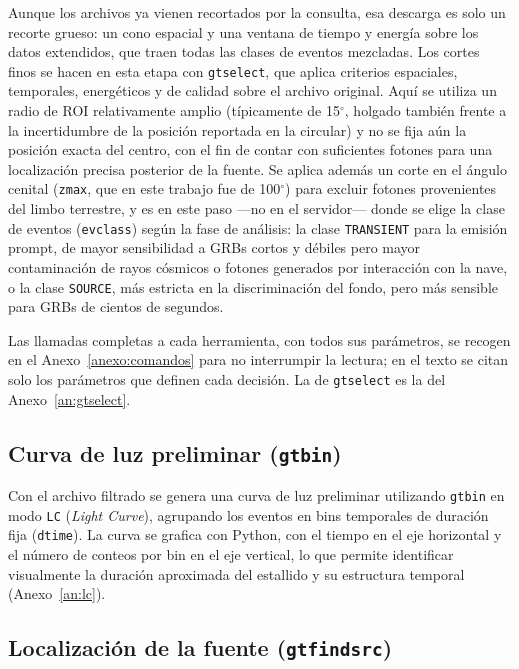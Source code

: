 Aunque los archivos ya vienen recortados por la consulta, esa descarga es solo un recorte grueso: un cono espacial y una ventana de tiempo y energía sobre los datos extendidos, que traen todas las clases de eventos mezcladas. Los cortes finos se hacen en esta etapa con \texttt{gtselect}, que aplica criterios espaciales, temporales, energéticos y de calidad sobre el archivo original. Aquí se utiliza un radio de ROI relativamente amplio (típicamente de 15$^{\circ}$, holgado también frente a la incertidumbre de la posición reportada en la circular) y no se fija aún la posición exacta del centro, con el fin de contar con suficientes fotones para una localización precisa posterior de la fuente. Se aplica además un corte en el ángulo cenital (\texttt{zmax}, que en este trabajo fue de 100$^{\circ}$) para excluir fotones provenientes del limbo terrestre, y es en este paso —no en el servidor— donde se elige la clase de eventos (\texttt{evclass}) según la fase de análisis: la clase \texttt{TRANSIENT} para la emisión prompt, de mayor sensibilidad a GRBs cortos y débiles pero mayor contaminación de rayos cósmicos o fotones generados por interacción con la nave, o la clase \texttt{SOURCE}, más estricta en la discriminación del fondo, pero más sensible para GRBs de cientos de segundos.

Las llamadas completas a cada herramienta, con todos sus parámetros, se recogen en el Anexo~\ref{anexo:comandos} para no interrumpir la lectura; en el texto se citan solo los parámetros que definen cada decisión. La de \texttt{gtselect} es la del Anexo~\ref{an:gtselect}.

\subsection{Curva de luz preliminar (\texttt{gtbin})}

Con el archivo filtrado se genera una curva de luz preliminar utilizando \texttt{gtbin} en modo \texttt{LC} (\textit{Light Curve}), agrupando los eventos en bins temporales de duración fija (\texttt{dtime}). La curva se grafica con Python, con el tiempo en el eje horizontal y el número de conteos por bin en el eje vertical, lo que permite identificar visualmente la duración aproximada del estallido y su estructura temporal (Anexo~\ref{an:lc}).

\subsection{Localización de la fuente (\texttt{gtfindsrc})}

